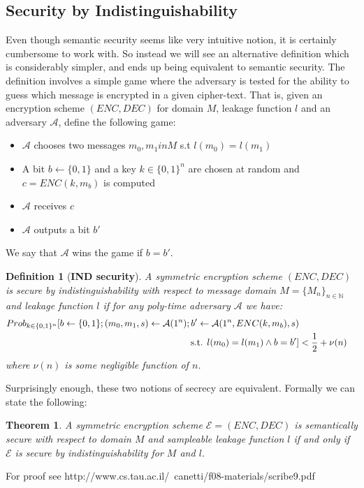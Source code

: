 \documentclass[12pt]{article}
\newcommand{\adv}{\mathcal{A}}
\newcommand{\pr}{Prob}
\newtheorem{definition}{Definition}[section]
\newtheorem{theorem}{Theorem}[section]
\begin{document}
\subsection{Security by Indistinguishability}
Even though semantic security seems like very intuitive notion, it is certainly cumbersome to work with. So instead we will see an alternative definition which is considerably simpler, and ends up being equivalent to semantic security. The definition involves a simple game where the adversary is tested for the ability to guess which message is encrypted in a given cipher-text. That is, given an encryption scheme $(ENC,DEC)$ for domain $M$, leakage function $l$ and an adversary $\adv$, define the following game:
\begin{itemize}
\item $\adv$ chooses two messages $m_0,m_1 in M$ s.t $l(m_0) = l(m_1)$ 
\item A bit $b \leftarrow \{0, 1\}$ and a key $k \in \{0, 1\}^n$ are chosen at random and $c = ENC(k,m_b)$ is computed 
\item $\adv$ receives $c$
\item $\adv$ outputs a bit $b'$
\end{itemize}
We say that $\adv$ wins the game if $b = b'$.
\begin{definition}[\textbf{IND security}]
A symmetric encryption scheme $(ENC,DEC)$ is secure by indistinguishability with respect to message domain $M = \{M_n\}_{n\in\mathbb{N}}$ and leakage function $l$ if for any poly-time adversary $\adv$ we have:
\begin{align*} \pr_{k \in \{0,1\}^n}[b\leftarrow \{0,1\}; (m_0,m_1,s) \leftarrow \adv(1^n); b' \leftarrow \adv(1^n,ENC(k,m_b),s)\\ \text{s.t. } l(m_0) = l(m_1) \wedge b = b'] &< {1 \over 2} + \nu (n)
\end{align*}
where $\nu(n)$ is some negligible function of $n$.
\end{definition}
Surprisingly enough, these two notions of secrecy are equivalent. Formally we can state the following:
\begin{theorem}
A symmetric encryption scheme $\mathcal{E} = (ENC,DEC)$ is semantically secure with respect to domain $M$ and sampleable leakage function $l$ if and only if $\mathcal{E}$ is secure by indistinguishability for $M$ and $l$.
\end{theorem}
For proof see http://www.cs.tau.ac.il/~canetti/f08-materials/scribe9.pdf
\end{document}
